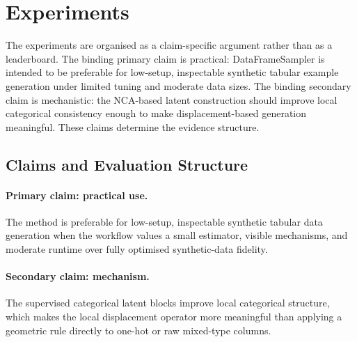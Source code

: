 \section{Experiments}
\label{sec:experiments}

The experiments are organised as a claim-specific argument rather than as a
leaderboard. The binding primary claim is practical: DataFrameSampler is
intended to be preferable for low-setup, inspectable synthetic tabular example
generation under limited tuning and moderate data sizes. The binding secondary
claim is mechanistic: the NCA-based latent construction should improve local
categorical consistency enough to make displacement-based generation
meaningful. These claims determine the evidence structure.

\subsection{Claims and Evaluation Structure}

\paragraph{Primary claim: practical use.}
The method is preferable for low-setup, inspectable synthetic tabular data
generation when the workflow values a small estimator, visible mechanisms, and
moderate runtime over fully optimised synthetic-data fidelity.

\paragraph{Secondary claim: mechanism.}
The supervised categorical latent blocks improve local categorical structure,
which makes the local displacement operator more meaningful than applying a
geometric rule directly to one-hot or raw mixed-type columns.

